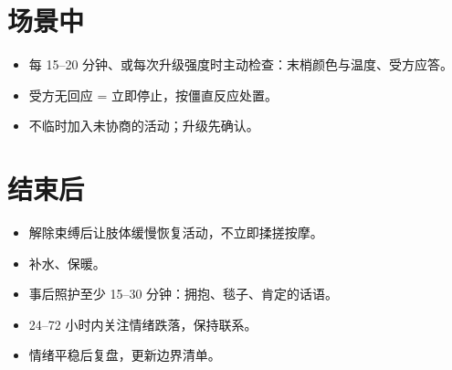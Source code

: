 \documentclass[12pt,UTF8]{ctexbook}
\begin{document}
\section{场景中}

\begin{itemize}
\item[$\square$] 每 15--20 分钟、或每次升级强度时主动检查：末梢颜色与温度、受方应答。
\item[$\square$] 受方无回应 = 立即停止，按僵直反应处置。
\item[$\square$] 不临时加入未协商的活动；升级先确认。
\end{itemize}

\section{结束后}

\begin{itemize}
\item[$\square$] 解除束缚后让肢体缓慢恢复活动，不立即揉搓按摩。
\item[$\square$] 补水、保暖。
\item[$\square$] 事后照护至少 15--30 分钟：拥抱、毯子、肯定的话语。
\item[$\square$] 24--72 小时内关注情绪跌落，保持联系。
\item[$\square$] 情绪平稳后复盘，更新边界清单。
\end{itemize}




\printindex
\end{document}
